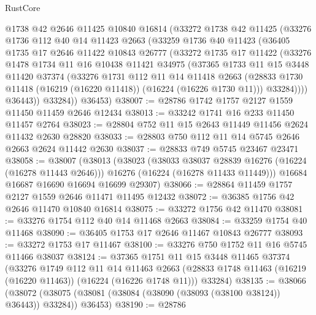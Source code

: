 \begin{lexlean}{RustCore}
\begin{coremodule}
      @1738
      @42
      @2646
      @11425
      @10840
      @16814
      (@33272
        @1738
        @42
        @11425
        (@33276
          @1736
          @112
          @40
          @14
          @11423
          @2663
          (@33259
            @1736
            @40
            @11423
            (@36405
              @1735
              @17
              @2646
              @11422
              @10843
              @26777
              (@33272
                @1735
                @17
                @11422
                (@33276
                  @1478
                  @1734
                  @11
                  @16
                  @10438
                  @11421
                  @34975
                  (@37365
                    @1733
                    @11
                    @15
                    @3448
                    @11420
                    @37374
                    (@33276
                      @1731
                      @112
                      @11
                      @14
                      @11418
                      @2663
                      (@28833 @1730 @11418 (@16219 (@16220 @11418)) (@16224 (@16226 @1730 @11)))
                      @33284))))
              @36443))
          @33284))
      @36453)
@38007 := @28786 @1742 @1757 @2127 @1559 @11450 @11459 @2646 @12434
@38013 := @33242 @1741 @16 @233 @11450 @11457 @2764
@38023 := @28804 @752 @11 @15 @2643 @11449 @11456 @2624 @11432 @2630 @28820
@38033 := @28803 @750 @112 @11 @14 @5745 @2646 @2663 @2624 @11442 @2630
@38037 := @28833 @749 @5745 @23467 @23471
@38058 := @38007
    (@38013
      (@38023
        (@38033 @38037 @28839 @16276 (@16224 (@16278 @11443 @2646)))
        @16276
        (@16224 (@16278 @11433 @11449)))
      @16684
      @16687
      @16690
      @16694
      @16699
      @29307)
@38066 := @28864 @11459 @1757 @2127 @1559 @2646 @11471 @11495 @12432
@38072 := @36385 @1756 @42 @2646 @11470 @10840 @16814
@38075 := @33272 @1756 @42 @11470
@38081 := @33276 @1754 @112 @40 @14 @11468 @2663
@38084 := @33259 @1754 @40 @11468
@38090 := @36405 @1753 @17 @2646 @11467 @10843 @26777
@38093 := @33272 @1753 @17 @11467
@38100 := @33276 @750 @1752 @11 @16 @5745 @11466 @38037
@38124 := @37365
    @1751
    @11
    @15
    @3448
    @11465
    @37374
    (@33276
      @1749
      @112
      @11
      @14
      @11463
      @2663
      (@28833 @1748 @11463 (@16219 (@16220 @11463)) (@16224 (@16226 @1748 @11)))
      @33284)
@38135 := @38066
    (@38072 (@38075 (@38081 (@38084 (@38090 (@38093 (@38100 @38124)) @36443)) @33284)) @36453)
@38190 := @28786

\end{coremodule}
\end{lexlean}

